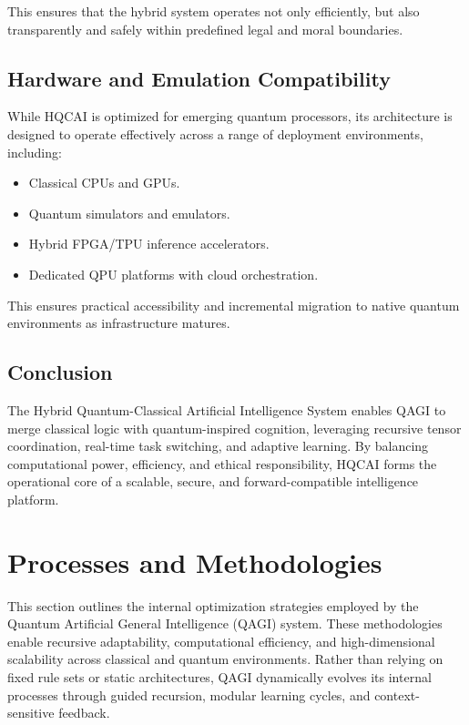 \documentclass{article}
\theoremstyle{plain}
\theoremstyle{claimstyle}
\begin{document}
This ensures that the hybrid system operates not only efficiently, but also transparently and safely within predefined legal and moral boundaries.

\subsection{Hardware and Emulation Compatibility}

While HQCAI is optimized for emerging quantum processors, its architecture is designed to operate effectively across a range of deployment environments, including:
\begin{itemize}
    \item Classical CPUs and GPUs.
    \item Quantum simulators and emulators.
    \item Hybrid FPGA/TPU inference accelerators.
    \item Dedicated QPU platforms with cloud orchestration.
\end{itemize}

This ensures practical accessibility and incremental migration to native quantum environments as infrastructure matures.

\subsection{Conclusion}

The Hybrid Quantum-Classical Artificial Intelligence System enables QAGI to merge classical logic with quantum-inspired cognition, leveraging recursive tensor coordination, real-time task switching, and adaptive learning. By balancing computational power, efficiency, and ethical responsibility, HQCAI forms the operational core of a scalable, secure, and forward-compatible intelligence platform.


\section{Processes and Methodologies}

This section outlines the internal optimization strategies employed by the Quantum Artificial General Intelligence (QAGI) system. These methodologies enable recursive adaptability, computational efficiency, and high-dimensional scalability across classical and quantum environments. Rather than relying on fixed rule sets or static architectures, QAGI dynamically evolves its internal processes through guided recursion, modular learning cycles, and context-sensitive feedback.
\end{document}
